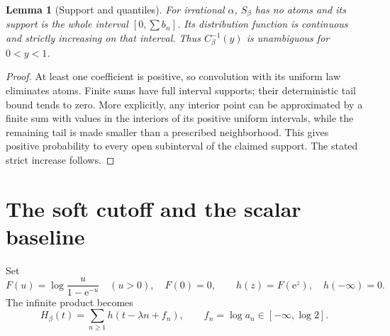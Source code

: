 \documentclass[11pt,a4paper]{article}
\newtheorem{lemma}[theorem]{Lemma}
\theoremstyle{definition}
\theoremstyle{remark}\newtheorem{remark}[theorem]{Remark}
\newcommand{\e}{\mathrm e}
\begin{document}
\begin{lemma}[Support and quantiles]
\label{lem:quantile-exists}
For irrational $\alpha$, $S_\beta$ has no atoms and its support is the whole
interval $[0,\sum b_n]$.  Its distribution function is continuous and strictly
increasing on that interval.  Thus $C_\beta^{-1}(y)$ is unambiguous for
$0<y<1$.
\end{lemma}
\begin{proof}
At least one coefficient is positive, so convolution with its uniform law
eliminates atoms.  Finite sums have full interval supports; their deterministic
tail bound tends to zero.  More explicitly, any interior point can be
approximated by a finite sum with values in the interiors of its positive
uniform intervals, while the remaining tail is made smaller than a prescribed
neighborhood.  This gives positive probability to every open subinterval of
the claimed support.  The stated strict increase follows.
\end{proof}

\section{The soft cutoff and the scalar baseline}
\label{sec:kernel}

Set
\begin{equation}
 F(u)=\log\frac{u}{1-\e^{-u}}\quad(u>0),\quad F(0)=0,
 \qquad h(z)=F(\e^z),\quad h(-\infty)=0.
 \label{eq:kernel}
\end{equation}
The infinite product becomes
\begin{equation}
 H_\beta(t)=\sum_{n\ge1}h(t-\lambda n+f_n),
 \qquad f_n=\log a_n\in[-\infty,\log2].
 \label{eq:Hsum}
\end{equation}
\end{document}
